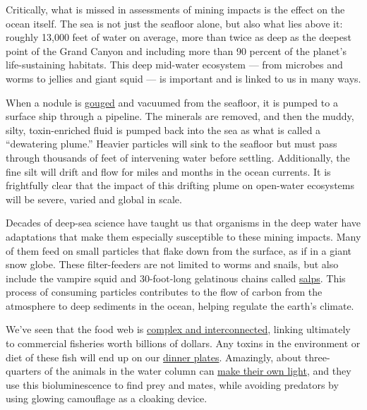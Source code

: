 Critically, what is missed in assessments of mining impacts is the
effect on the ocean itself. The sea is not just the seafloor alone, but
also what lies above it: roughly 13,000 feet of water on average, more
than twice as deep as the deepest point of the Grand Canyon and
including more than 90 percent of the planet's life-sustaining habitats.
This deep mid-water ecosystem --- from microbes and worms to jellies and
giant squid --- is important and is linked to us in many ways.

When a nodule is
\href{https://www.usgs.gov/media/images/deep-sea-mining-machines}{gouged}
and vacuumed from the seafloor, it is pumped to a surface ship through a
pipeline. The minerals are removed, and then the muddy, silty,
toxin-enriched fluid is pumped back into the sea as what is called a
``dewatering plume.'' Heavier particles will sink to the seafloor but
must pass through thousands of feet of intervening water before
settling. Additionally, the fine silt will drift and flow for miles and
months in the ocean currents. It is frightfully clear that the impact of
this drifting plume on open-water ecosystems will be severe, varied and
global in scale.

Decades of deep-sea science have taught us that organisms in the deep
water have adaptations that make them especially susceptible to these
mining impacts. Many of them feed on small particles that flake down
from the surface, as if in a giant snow globe. These filter-feeders are
not limited to worms and snails, but also include the vampire squid and
30-foot-long gelatinous chains called
\href{https://www.whoi.edu/know-your-ocean/ocean-topics/polar-research/polar-life/the-watery-world-of-salps/}{salps}.
This process of consuming particles contributes to the flow of carbon
from the atmosphere to deep sediments in the ocean, helping regulate the
earth's climate.

We've seen that the food web is
\href{https://www.nytimes3xbfgragh.onion/2017/12/19/science/deep-sea-food-web.html}{complex
and interconnected}, linking ultimately to commercial fisheries worth
billions of dollars. Any toxins in the environment or diet of these fish
will end up on our
\href{https://www.theatlantic.com/science/archive/2019/08/why-changing-climate-means-more-mercury-seafood/595663/}{dinner
plates}. Amazingly, about three-quarters of the animals in the water
column can
\href{https://www.nytimes3xbfgragh.onion/interactive/2017/08/21/science/the-deep-seas-are-alive-with-light.html}{make
their own light}, and they use this bioluminescence to find prey and
mates, while avoiding predators by using glowing camouflage as a
cloaking device.

